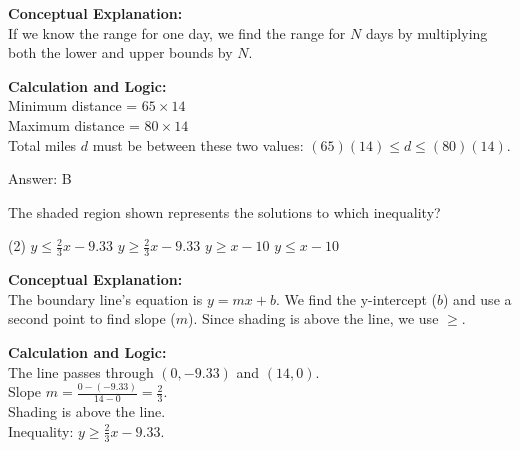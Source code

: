 \documentclass[11pt,paper=a4,answers]{exam}
\begin{document}
\begin{questions}
\begin{solution}
\textbf{Conceptual Explanation:} \\
If we know the range for one day, we find the range for $N$ days by multiplying both the lower and upper bounds by $N$.

\vspace{10pt}
\textbf{Calculation and Logic:} \\
Minimum distance = $65 \times 14$ \\
Maximum distance = $80 \times 14$ \\
Total miles $d$ must be between these two values: $(65)(14) \le d \le (80)(14)$.

\vspace{15pt}
Answer: \colorbox{yellow!100}{B}
\end{solution}

\question
The shaded region shown represents the solutions to which inequality?

\begin{center}
\end{center}

\begin{tasks}(2)
    \task $y \le \frac{2}{3}x - 9.33$
    \task $y \ge \frac{2}{3}x - 9.33$
    \task $y \ge x - 10$
    \task $y \le x - 10$
\end{tasks}

\begin{solution}
\textbf{Conceptual Explanation:} \\
The boundary line's equation is $y = mx + b$. We find the y-intercept ($b$) and use a second point to find slope ($m$). Since shading is above the line, we use $\ge$.

\vspace{10pt}
\textbf{Calculation and Logic:} \\
The line passes through $(0, -9.33)$ and $(14, 0)$. \\
Slope $m = \frac{0 - (-9.33)}{14 - 0} = \frac{2}{3}$. \\
Shading is above the line. \\
Inequality: $y \ge \frac{2}{3}x - 9.33$.


\end{solution}
\end{questions}
\end{document}
